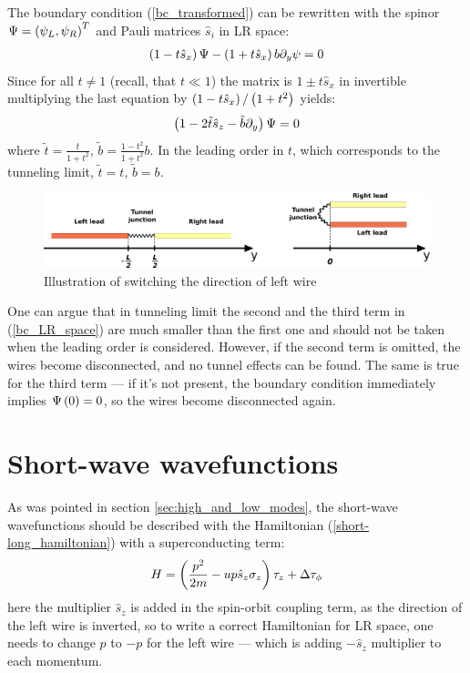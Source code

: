 The boundary condition (\ref{bc_transformed}) can be rewritten with the spinor $ \Psi=\left(\psi_L, \psi_R\right)^T $ and Pauli matrices $ \hat{s}_i $ in LR space:
\begin{gather}
	\left(1-t\hat{s}_x\right)\Psi-\left(1+t \hat{s}_x\right)b\partial_y\psi=0
\end{gather}
Since for all $ t\ne 1 $ (recall, that $ t\ll1 $) the matrix is $ 1\pm t\hat{s}_x $ in invertible multiplying the last equation by $ \left(1-t\hat{s}_x\right)/\left(1+t^2\right) $ yields:
\begin{gather}
\label{bc_LR_space}
	\left(1-2\tilde{t}\hat{s}_z-\tilde{b}\partial_y\right)\Psi=0
\end{gather}
where $ \tilde{t}=\frac{t}{1+t^2} $, $ \tilde{b} = \frac{1-t^2}{1+t^2}b $. In the leading order in $ t $, which corresponds to the tunneling limit, $ \tilde{t}=t $, $ \tilde{b} = b $.
\begin{figure}[H]
	\centering
	\includegraphics[width=0.9\linewidth]{images/bc_transform}
	\caption{Illustration of switching the direction of left wire}
	\label{fig:bctransform}
\end{figure}

One can argue that in tunneling limit the second and the third term in (\ref{bc_LR_space}) are much smaller than the first one and should not be taken when the leading order is considered. However, if the second term is omitted, the wires become disconnected, and no tunnel effects can be found. The same is true for the third term --- if it's not present, the boundary condition immediately implies $ \Psi\left(0\right) = 0 $, so the wires become disconnected again.

\section{Short-wave wavefunctions}  
\label{sec:short-wave_wavefunctions}
As was pointed in section \ref{sec:high_and_low_modes}, the short-wave wavefunctions should be described with the Hamiltonian (\ref{short-long_hamiltonian}) with a superconducting term:
\begin{gather}
\label{high_mods_hamiltonian}
	H=\left(\frac{p^2}{2m}-up\hat{s}_z\sigma_z\right)\tau_z+\Delta\tau_\phi
\end{gather}
here the multiplier $ \hat{s}_z $ is added in the spin-orbit coupling term, as the direction of the left wire is inverted, so to write a correct Hamiltonian for LR space, one needs to change $ p $ to $ -p $ for the left wire --- which is adding $ -\hat{s}_z $ multiplier to each momentum.

